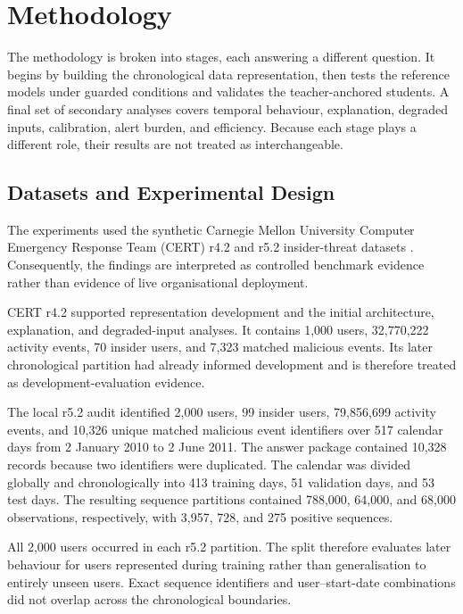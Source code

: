 \section{Methodology}
\label{sec:methodology}
The methodology is broken into stages, each answering a different question.
It begins by building the chronological data representation, then tests the
reference models under guarded conditions and validates the teacher-anchored
students. A final set of secondary analyses covers temporal behaviour,
explanation, degraded inputs, calibration, alert burden, and efficiency.
Because each stage plays a different role, their results are not treated as
interchangeable.

\subsection{Datasets and Experimental Design}
\label{subsec:dataset_design}
The experiments used the synthetic Carnegie Mellon University Computer
Emergency Response Team (CERT) r4.2 and r5.2 insider-threat datasets
\cite{GlasserLindauer2013}. Consequently, the findings are interpreted as
controlled benchmark evidence rather than evidence of live organisational
deployment.

\smallskip
CERT r4.2 supported representation development and the initial architecture,
explanation, and degraded-input analyses. It contains 1,000 users,
32,770,222 activity events, 70 insider users, and 7,323 matched malicious
events. Its later chronological partition had already informed development
and is therefore treated as development-evaluation evidence.

\smallskip
The local r5.2 audit identified 2,000 users, 99 insider users, 79,856,699
activity events, and 10,326 unique matched malicious event identifiers
over 517 calendar days from 2 January 2010 to 2 June 2011. The answer
package contained 10,328 records because two identifiers were duplicated.
The calendar was divided globally and chronologically into 413 training
days, 51 validation days, and 53 test days. The resulting sequence
partitions contained 788,000, 64,000, and 68,000 observations, respectively,
with 3,957, 728, and 275 positive sequences.

\smallskip
All 2,000 users occurred in each r5.2 partition. The split therefore
evaluates later behaviour for users represented during training rather than
generalisation to entirely unseen users. Exact sequence identifiers and
user--start-date combinations did not overlap across the chronological
boundaries.

